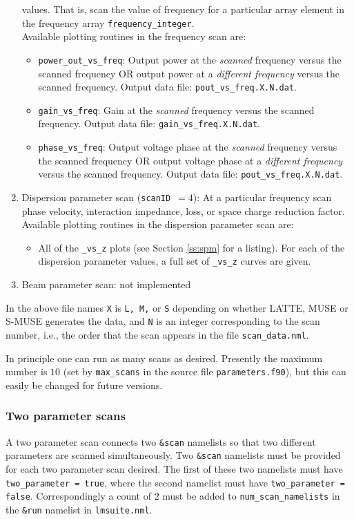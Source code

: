 \documentclass{article}
\begin{document}
\begin{enumerate}
  values. That is, scan the value of frequency for a particular array
  element in the frequency array {\tt frequency\_integer}.\\
  Available plotting routines in the frequency scan are:
  \begin{itemize}
  \item {\tt power\_out\_vs\_freq}: Output power at the {\em scanned}
    frequency versus the scanned frequency OR output power at a {\em different
    frequency} versus the scanned frequency.
    Output data file: {\tt pout\_vs\_freq.X.N.dat}.
  \item {\tt gain\_vs\_freq}: Gain at the {\em scanned}
    frequency versus the scanned frequency.
    Output data file: {\tt gain\_vs\_freq.X.N.dat}.
  \item {\tt phase\_vs\_freq}: Output voltage phase at the {\em scanned}
    frequency versus the scanned frequency OR output voltage phase
    at a {\em different frequency} versus the scanned frequency.
    Output data file: {\tt pout\_vs\_freq.X.N.dat}.
  \end{itemize}
\item Dispersion parameter scan ({\tt scanID}~$=4$): At a particular frequency
  scan phase velocity, interaction impedance, loss, or space charge reduction
  factor.\\
  Available plotting routines in the dispersion parameter scan are:
  \begin{itemize}
  \item All of the {\tt *\_vs\_z} plots (see Section \ref{ss:spm} for a
    listing). For each of the dispersion parameter values, a full set of
    {\tt *\_vs\_z} curves are given.
  \end{itemize}
\item Beam parameter scan: not implemented
\end{enumerate}
In the above file names {\tt X} is {\tt L, M,} or {\tt S} depending
on whether LATTE, MUSE or S-MUSE generates the data, and {\tt N} is
an integer corresponding to the scan number, i.e., the order that
the scan appears in the file {\tt scan\_data.nml}.

In principle one can run as many scans as desired. Presently the maximum
number is $10$ (set by {\tt max\_scans} in the source file
{\tt parameters.f90}), but this can easily be changed for future versions.


\subsubsection{Two parameter scans}
A two parameter scan connects two {\tt \&scan} namelists so that
two different parameters are scanned simultaneously.
Two {\tt \&scan} namelists must be provided for each two parameter
scan desired. The first of
these two namelists must have {\tt two\_parameter = true}, where the second
namelist must have {\tt two\_parameter = false}. Correspondingly
a count of $2$ must be added to {\tt num\_scan\_namelists} in the
{\tt\&run} namelist in {\tt lmsuite.nml}.
\end{document}
